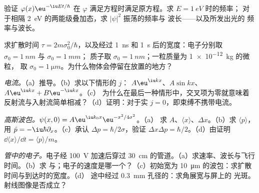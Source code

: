 \begin{exercise}[$\star$]\label{exo:b2:schrodinger-wave-functions:3}
验证 $\varphi(x)\eu^{-\iu Et/\hbar}$ 在 $\varphi$
满足方程时满足原方程。求 $E = \qty{1}{eV}$ 时的频率；
对于相隔 \qty{2}{eV} 的两能级叠加态，求 $|\psi|^2$ 振荡的频率与
波长——以及所发出光的
频率与波长。
\end{exercise}

\begin{exercise}[$\star$]\label{exo:b2:schrodinger-wave-functions:4}
求扩散时间 $\tau = 2m\sigma_0^2/\hbar$，以及经过 \qty{1}{ns} 和
\qty{1}{s} 后的宽度：电子分别取 $\sigma_0 = \qty{1}{nm}$ 与 $\sigma_0 = \qty{1}{mm}$；
质子取 $\sigma_0 = \qty{1}{nm}$；一粒质量为 \qty{1e-12}{kg} 的微粒，
取 $\sigma_0 = \qty{1}{\micro m}$。为什么物体会停留在放置的地方？
\end{exercise}

\begin{exercise}[$\star\star$]\label{exo:b2:schrodinger-wave-functions:5}
\emph{电流。}（a）推导。（b）求以下情形的 $j$：
$A\eu^{\iu kx}$、$A\sin kx$、$A\eu^{\iu kx} + B\eu^{-\iu kx}$。（c）
为什么在最后一种情形中，交叉项为零就意味着
反射流与入射流简单相减？（d）证明：对于实
$j = 0$，即束缚不携带电流。
\end{exercise}

\begin{exercise}[$\star\star$]\label{exo:b2:schrodinger-wave-functions:6}
\emph{高斯波包。}$\psi(x,0) = A\eu^{\iu k_0x}\eu^{-x^2/4\sigma^2}$。（a）
求 $A$、$\langle x\rangle$、$\Delta x$。（b）求 $\langle p\rangle$，用 $\hat p =
-\iu\hbar\partial_x$。（c）承认 $\Delta p = \hbar/2\sigma$，验证
$\Delta x\Delta p = \hbar/2$。（d）由证明 $\dd\langle x\rangle/\dd t = \langle
p\rangle/m$。
\end{exercise}

\begin{exercise}[$\star\star$]\label{exo:b2:schrodinger-wave-functions:7}
\emph{管中的电子。}电子经 \qty{100}{V} 加速后穿过
\qty{30}{cm} 的管道。（a）求速率、波长与飞行时间。（b）求
与；电子的速度是哪一个？（c）初始宽为
\qty{10}{\micro m} 的波包：求扩散时间与到达时的宽度。（d）
途中经过 \qty{0.3}{mm} 孔径的：求角展宽与屏上的
光斑。射线图像是否成立？
\end{exercise}

